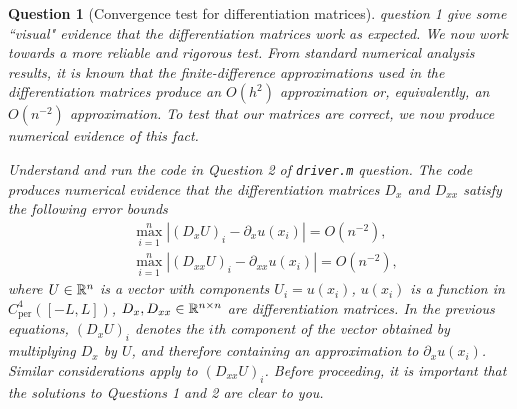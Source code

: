 \documentclass[a4paper]{siamart220329}
\theoremstyle{plain}
\newtheorem{question}{Question}
\begin{document}
\begin{question}[Convergence test for differentiation matrices]
  \label{question:convPer}
question 1 give some ``visual" evidence that
the differentiation matrices work as expected. We now work towards a more reliable and
rigorous test. From standard numerical analysis results, it is known that the
finite-difference approximations used in the differentiation matrices produce an
$O(h^2)$ approximation or, equivalently, an $O(n^{-2})$ approximation. To test that
our matrices are correct, we now produce numerical evidence of this fact.

Understand and run the code in Question 2 of \lstinline|driver.m| question. The code
produces numerical evidence that the differentiation matrices $D_x$ and $D_{xx}$
satisfy the following error bounds
\[
  \begin{aligned}
    & \max_{i=1}^n | (D_x U)_i - \partial_x u(x_i) | = O(n^{-2}), \\
    & \max_{i=1}^n | (D_{x x} U)_i - \partial_{x x} u(x_i) | = O(n^{-2}),
  \end{aligned}
\]
where $U \in \mathbb{R}^n$ is a vector with components $U_i = u(x_i)$, $u(x_i)$ is a
function in $C^4_\textrm{per}([-L,L])$, $D_x, D_{x x} \in \mathbb{R}^{n
\times n}$ are differentiation matrices. In the previous equations, $(D_x U)_i$
denotes the $i$th component of the vector obtained by multiplying $D_x$ by $U$, and
therefore containing an approximation to $\partial_x u(x_i)$. Similar considerations
apply to $(D_{x x} U)_i$. Before proceeding, it is important that the solutions to
Questions 1 and 2 are clear to you.
\end{question}
\end{document}
